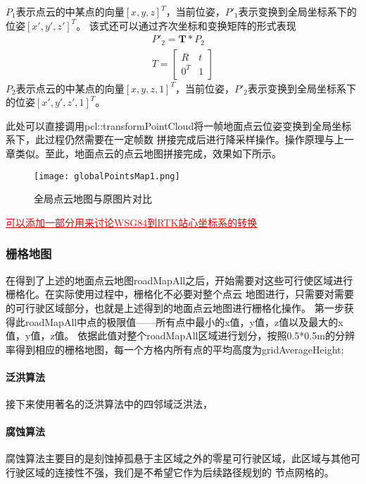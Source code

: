 $P_1$表示点云的中某点的向量$[x,y,z]^T$，当前位姿，$P'_1$表示变换到全局坐标系下的位姿$[x',y',z']^T$。
该式还可以通过齐次坐标和变换矩阵的形式表现
\begin{equation}
    \begin{aligned}
    P'_2 = \symbf{T} * P_2 \\
    T=\begin{bmatrix}
        R& t\\
        0^T&1
      \end{bmatrix}
    \end{aligned}
\end{equation}
$P_2$表示点云的中某点的向量$[x,y,z,1]^T$，当前位姿，$P'_2$表示变换到全局坐标系下的位姿$[x',y',z',1]^T$。

此处可以直接调用pcl::transformPointCloud将一帧地面点云位姿变换到全局坐标系下，此过程仍然需要在一定帧数
拼接完成后进行降采样操作。操作原理与上一章类似。至此，地面点云的点云地图拼接完成，效果如下所示。
\begin{figure}[ht]
    \centering
    \texttt{[image: globalPointsMap1.png]}
    \caption{全局点云地图与原图片对比}
\end{figure}

\textcolor{red}{\underline{可以添加一部分用来讨论WSG84到RTK站心坐标系的转换}}

\subsubsection{栅格地图}
在得到了上述的地面点云地图roadMapAll之后，开始需要对这些可行使区域进行栅格化。在实际使用过程中，栅格化不必要对整个点云
地图进行，只需要对需要的可行驶区域部分，也就是上述得到的地面点云地图进行栅格化操作。
第一步获得此roadMapAll中点的极限值——所有点中最小的x值，y值，z值以及最大的x值，y值，z值。
依据此值对整个roadMapAll区域进行划分，按照0.5*0.5m的分辨率得到相应的栅格地图，每一个方格内所有点的平均高度为gridAverageHeight;


\paragraph{泛洪算法}
接下来使用著名的泛洪算法中的四邻域泛洪法，

\paragraph{腐蚀算法}
腐蚀算法主要目的是刻蚀掉孤悬于主区域之外的零星可行驶区域，此区域与其他可行驶区域的连接性不强，我们是不希望它作为后续路径规划的
节点网格的。





